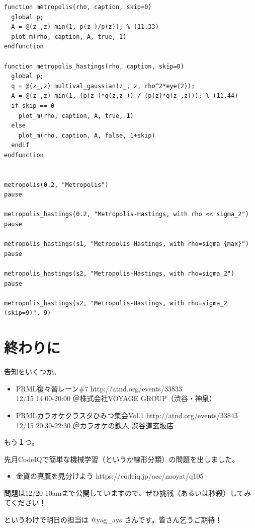 \documentclass{jsarticle}
\begin{document}
\begin{verbatim}
function metropolis(rho, caption, skip=0)
  global p;
  A = @(z_,z) min(1, p(z_)/p(z)); % (11.33)
  plot_m(rho, caption, A, true, 1)
endfunction

function metropolis_hastings(rho, caption, skip=0)
  global p;
  q = @(z_,z) multival_gaussian(z_, z, rho^2*eye(2));
  A = @(z_,z) min(1, (p(z_)*q(z,z_)) / (p(z)*q(z_,z))); % (11.44)
  if skip == 0
    plot_m(rho, caption, A, true, 1)
  else
    plot_m(rho, caption, A, false, 1+skip)
  endif
endfunction


metropolis(0.2, "Metropolis")
pause

metropolis_hastings(0.2, "Metropolis-Hastings, with rho << sigma_2")
pause

metropolis_hastings(s1, "Metropolis-Hastings, with rho=sigma_{max}")
pause

metropolis_hastings(s2, "Metropolis-Hastings, with rho=sigma_2")
pause

metropolis_hastings(s2, "Metropolis-Hastings, with rho=sigma_2 (skip=9)", 9)
\end{verbatim}

\section{終わりに}
告知をいくつか。

\begin{itemize}
\item PRML復々習レーン\#7 http://atnd.org/events/33833 \\
12/15 14:00-20:00 ＠株式会社VOYAGE GROUP（渋谷・神泉）

\item PRMLカラオケクラスタひみつ集会Vol.1 http://atnd.org/events/33843 \\
12/15 20:30-22:30 ＠カラオケの鉄人 渋谷道玄坂店 
\end{itemize}

もう１つ。

先月CodeIQで簡単な機械学習（というか線形分類）の問題を出しました。
\begin{itemize}
\item 金貨の真贋を見分けよう https://codeiq.jp/ace/naoyat/q105
\end{itemize}
問題は12/20 10amまで公開していますので、ぜひ挑戦（あるいは秒殺）してみてください！

というわけで明日の担当は @yag\_ays さんです。皆さん乞うご期待！
\end{document}
